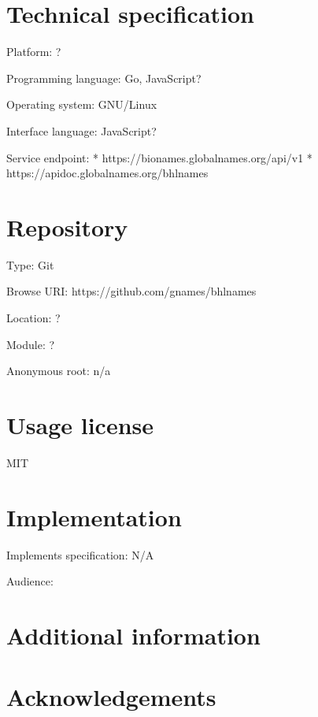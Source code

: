 \documentclass[
]{article}
\begin{document}
\hypertarget{technical-specification}{%
\section{Technical specification}\label{technical-specification}}

Platform: ?

Programming language: Go, JavaScript?

Operating system: GNU/Linux

Interface language: JavaScript?

Service endpoint: * https://bionames.globalnames.org/api/v1 *
https://apidoc.globalnames.org/bhlnames

\hypertarget{repository}{%
\section{Repository}\label{repository}}

Type: Git

Browse URI: https://github.com/gnames/bhlnames

Location: ?

Module: ?

Anonymous root: n/a

\hypertarget{usage-license}{%
\section{Usage license}\label{usage-license}}

MIT

\hypertarget{implementation}{%
\section{Implementation}\label{implementation}}

Implements specification: N/A

Audience:

\hypertarget{additional-information}{%
\section{Additional information}\label{additional-information}}

\hypertarget{acknowledgements}{%
\section{Acknowledgements}\label{acknowledgements}}
\end{document}
